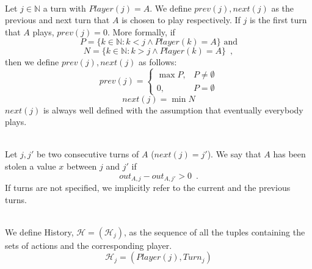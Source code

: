 \documentclass[11pt]{llncs}
\begin{document}
     \begin{definition} \ \\
        Let $j \in \mathbb{N}$ a turn with $Player\left(j\right) = A$. We define $prev\left(j\right), next\left(j\right)$ as
        the previous and next turn that $A$ is chosen to play respectively. If $j$ is the first turn that $A$ plays,
        $prev\left(j\right) = 0$. More formally, if
        \begin{equation}
           P = \{k \in \mathbb{N} : k < j \wedge Player\left(k\right) = A\} \mbox{ and}
        \end{equation}
        \begin{equation}
           N = \{k \in \mathbb{N} : k > j \wedge Player\left(k\right) = A\} \enspace,
        \end{equation}
        then we define $prev\left(j\right), next\left(j\right)$ as follows:
        \begin{equation}
           prev\left(j\right) = \begin{cases}
              \max{P}, & P \neq \emptyset \\
              0, & P = \emptyset
           \end{cases}
        \end{equation}
        \begin{equation}
           next\left(j\right) = \min{N}
        \end{equation}
        $next\left(j\right)$ is always well defined with the assumption that eventually everybody plays.
     \end{definition}
     \begin{definition}[$A$ is Stolen $x$] \ \\
        Let $j, j'$ be two consecutive turns of $A$ ($next\left(j\right) = j'$). We say that $A$ has been stolen a value $x$
        between $j$ and $j'$ if
        \begin{equation}
           out_{A,j} - out_{A,j'} > 0 \enspace.
        \end{equation}
        If turns are not specified, we implicitly refer to the current and the previous turns.
     \end{definition}
     \begin{definition}[History] \ \\
        We define History, $\mathcal{H} = \left(\mathcal{H}_j\right)$, as the sequence of all the tuples containing the sets
        of actions and the corresponding player.
        \begin{equation}
           \mathcal{H}_j = \left(Player\left(j\right), Turn_j\right)
        \end{equation}
     \end{definition}
\end{document}

